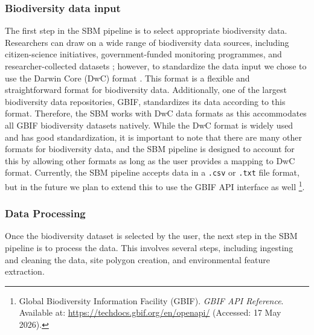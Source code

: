 \subsubsection{Biodiversity data input}
The first step in the SBM pipeline is to select appropriate biodiversity data. Researchers can draw on a wide range of biodiversity data sources, including citizen-science initiatives, government-funded monitoring programmes, and researcher-collected datasets \parencite{zipkin2023}; however, to standardize the data input we chose to use the Darwin Core (DwC) format \parencite{wieczorek_darwin_2012}. This format is a flexible and straightforward format for biodiversity data. Additionally, one of the largest biodiversity data repositories, GBIF, standardizes its data according to this format. Therefore, the SBM works with DwC data formats as this accommodates all GBIF biodiversity datasets natively. While the DwC format is widely used and has good standardization, it is important to note that there are many other formats for biodiversity data, and the SBM pipeline is designed to account for this by allowing other formats as long as the user provides a mapping to DwC format. Currently, the SBM pipeline accepts data in a \texttt{.csv} or \texttt{.txt} file format, but in the future we plan to extend this to use the GBIF API interface as well \footnote{Global Biodiversity Information Facility (GBIF). \textit{GBIF API Reference}. Available at: \url{https://techdocs.gbif.org/en/openapi/} (Accessed: 17 May 2026).}. 

\subsubsection{Data Processing}\label{subsubsec:data_processing}
Once the biodiversity dataset is selected by the user, the next step in the SBM pipeline is to process the data. This involves several steps, including ingesting and cleaning the data, site polygon creation, and environmental feature extraction. 

